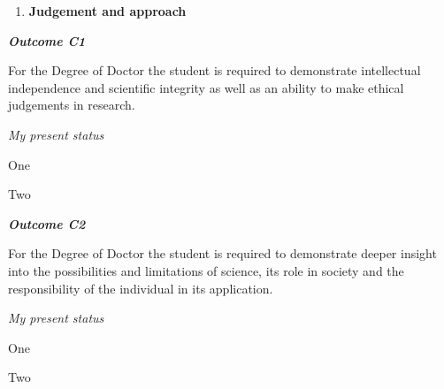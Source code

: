 \begin{enumerate}[resume, label=\textbf{\Alph*.}]
\item \textbf{Judgement and approach}
\end{enumerate}

\hfill\begin{minipage}{\dimexpr\textwidth-1cm}
\noindent \textbf{\emph{Outcome C1}}

\noindent For the Degree of Doctor the student is required to demonstrate intellectual independence and scientific integrity as well as an ability to make ethical judgements in research.\\

\xdef\tpd{\the\prevdepth}

\end{minipage}

\noindent \emph{My present status}
\begin{outcomes}
    \item One
    \item Two
\end{outcomes}
















\vspace{1em}
\hfill\begin{minipage}{\dimexpr\textwidth-1cm}
\noindent \textbf{\emph{Outcome C2}}

\noindent For the Degree of Doctor the student is required to demonstrate deeper insight into the possibilities and limitations of science, its role in society and the responsibility of the individual in its application.\\

\xdef\tpd{\the\prevdepth}

\end{minipage}

\noindent \emph{My present status}
\begin{outcomes}
    \item One
    \item Two
\end{outcomes}
















